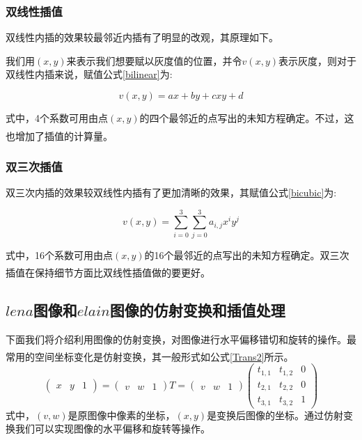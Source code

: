 \documentclass[UTF8]{ctexart}
\newcommand{\upcite}[1]{\textsuperscript{\textsuperscript{\cite{#1}}}}
\begin{document}
\subsubsection{双线性插值}

双线性内插的效果较最邻近内插有了明显的改观，其原理如下。

我们用$(x,y)$来表示我们想要赋以灰度值的位置，并令$v(x,y)$表示灰度，则对于双线性内插来说，赋值公式\ref{bilinear}为:

\begin{equation}\label{bilinear}
	v(x,y) = ax + by + cxy + d
\end{equation}

式中，4个系数可用由点$(x,y)$的四个最邻近的点写出的未知方程确定。不过，这也增加了插值的计算量\upcite{dip}。

\subsubsection{双三次插值}

双三次内插的效果较双线性内插有了更加清晰的效果，其赋值公式\ref{bicubic}为:

\begin{equation}\label{bicubic}
	v(x,y) = \sum_{i=0}^{3} \sum_{j=0}^{3} a_{i,j}x^{i}y^{j}
\end{equation}

式中，16个系数可用由点$(x,y)$的16个最邻近的点写出的未知方程确定。双三次插值在保持细节方面比双线性插值做的要更好\upcite{dip}。

\subsection{$lena$图像和$elain$图像的仿射变换和插值处理}

下面我们将介绍利用图像的仿射变换，对图像进行水平偏移错切和旋转的操作。最常用的空间坐标变化是仿射变换，其一般形式如公式\ref{Trans2}所示\upcite{dip}。
\begin{equation}\label{Trans2}
	\left( \begin{array}{ccc}
		x & y & 1
		\end{array} \right)
		=
	\left( \begin{array}{ccc}
		v & w & 1
		\end{array} \right) T
		=
	\left( \begin{array}{ccc}
		v & w & 1
		\end{array} \right) 
	\left( \begin{array}{ccc}
		t_{1,1}  & t_{1,2}  & 0  \\
		t_{2,1}  & t_{2,2} & 0 \\
		t_{3,1} & t_{3,2} & 1 
		\end{array} \right)
\end{equation}
式中，$(v,w)$是原图像中像素的坐标，$(x,y)$是变换后图像的坐标。通过仿射变换我们可以实现图像的水平偏移和旋转等操作。
\end{document}
